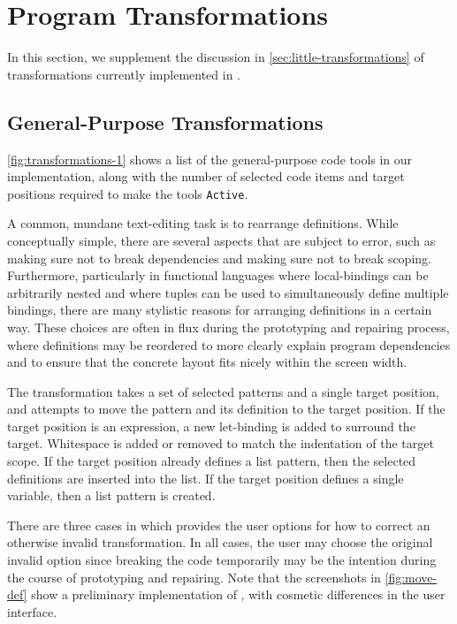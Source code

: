 \section{Program Transformations}
\label{sec:appendix-transformations}

In this section, we supplement the discussion in
\autoref{sec:little-transformations} of transformations currently implemented in
\deuce{}.

\subsection{General-Purpose Transformations}



\autoref{fig:transformations-1} shows a list of the general-purpose code tools
in our implementation, along with the number of selected code items and target
positions required to make the tools \verb+Active+.


A common, mundane text-editing task is to rearrange definitions. While
conceptually simple, there are several aspects that are subject to
error, such as making sure not to break dependencies and making sure not to break
scoping. Furthermore, particularly in functional languages where
local-bindings can be arbitrarily nested and where tuples can be used to
simultaneously define multiple bindings, there are many stylistic
reasons for arranging definitions in a certain way. These choices are
often in flux during the prototyping and repairing process, where
definitions may be reordered to more clearly explain program
dependencies and to ensure that the concrete layout fits nicely within
the screen width.

The  transformation takes a set of selected patterns
and a single target position, and attempts to move the pattern and its
definition to the target position. If the target position is
an expression, a new let-binding is added to surround the target.
Whitespace is added or removed to match the indentation of the target
scope. If the target position already defines a
list pattern, then the selected definitions are inserted into the list.
If the target position defines a single variable,
then a list pattern is created.

There are three cases in which \deuce{} provides the user options for
how to correct an otherwise invalid transformation.
In all cases, the user may choose the original
invalid option since breaking the code temporarily may be the
intention during the course of prototyping and repairing.
%
Note that the screenshots in \autoref{fig:move-def} show a preliminary
implementation of \deuce{}, with cosmetic differences in the user interface.

